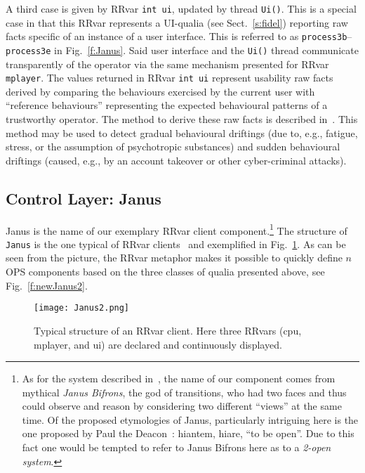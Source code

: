 \documentclass{article}
\begin{document}
A third case is given by RRvar \verb"int ui", updated
by thread \verb"Ui()". This is a special case in that this RRvar represents a UI-qualia (see Sect.~\ref{s:fidel})
reporting raw facts specific of an instance of a user interface. This is referred to as \texttt{process3b}--\texttt{process3e} in Fig.~\ref{f:Janus}.
Said user interface and the 
\verb"Ui()" thread communicate transparently of the operator via the same mechanism presented for
RRvar \verb"mplayer". The values returned in RRvar \verb"int ui" represent usability raw facts
derived by comparing the behaviours exercised by the current user with ``reference behaviours''
representing the expected behavioural patterns of a trustworthy operator. The method to derive
these raw facts is described in~\cite{DFB12b,VD13}. This method may be used
to detect gradual behavioural driftings (due to, e.g., fatigue, stress, or the assumption of psychotropic substances) and sudden behavioural driftings (caused, e.g., by an account takeover or other cyber-criminal attacks).




\subsection{Control Layer: Janus}\label{s:janus:janus}

Janus is the name of our exemplary  RRvar client component.\footnote{As for the
system described in~\cite{DeDe98}, the name of our component comes from
mythical \emph{Janus Bifrons}, the god of transitions, who had two faces and thus could observe
and reason by considering two different ``views'' at the same time. Of the proposed etymologies
of Janus, particularly intriguing here is the one proposed by Paul the Deacon~\cite{Festus}:
hiantem, hiare, ``to be open''. Due to this fact one would be tempted to refer to Janus Bifrons here as to a \emph{2-open system}.} The structure of \verb"Janus" is the one typical of RRvar clients~\cite{DB07d} and exemplified in Fig.~\ref{f:Janus1}.
As can be seen from the picture, the RRvar metaphor makes it possible to quickly define $n$OPS components
based on the three classes of qualia presented above, see Fig.~\ref{f:newJanus2}.

\begin{figure}
\centerline{\texttt{[image: Janus2.png]}}
\caption{Typical structure of an RRvar client. Here three RRvars (cpu, mplayer, and ui) are declared and continuously
displayed.}
\label{f:Janus1}
\end{figure}
\end{document}
